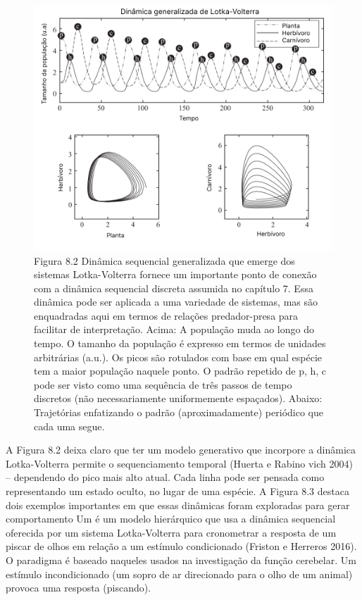 \documentclass[
  12pt,
]{book}
\begin{document}
\begin{figure}
\centering
\includegraphics{images/Figura_8_2.png}
\caption{Figura 8.2 Dinâmica sequencial generalizada que emerge dos sistemas Lotka-Volterra fornece um importante ponto de conexão com a dinâmica sequencial discreta assumida no capítulo 7. Essa dinâmica pode ser aplicada a uma variedade de sistemas, mas são enquadradas aqui em termos de relações predador-presa para facilitar de interpretação. Acima: A população muda ao longo do tempo. O tamanho da população é expresso em termos de unidades arbitrárias (a.u.). Os picos são rotulados com base em qual espécie tem a maior população naquele ponto. O padrão repetido de p, h, c pode ser visto como uma sequência de três passos de tempo discretos (não necessariamente uniformemente espaçados). Abaixo: Trajetórias enfatizando o padrão (aproximadamente) periódico que cada uma segue.}
\end{figure}

A Figura 8.2 deixa claro que ter um modelo generativo que incorpore a dinâmica Lotka-Volterra permite o sequenciamento temporal (Huerta e Rabino vich 2004) -- dependendo do pico mais alto atual. Cada linha pode ser pensada como representando um estado oculto, no lugar de uma espécie. A Figura 8.3 destaca dois exemplos importantes em que essas dinâmicas foram exploradas para gerar comportamento Um é um modelo hierárquico que usa a dinâmica sequencial oferecida por um sistema Lotka-Volterra para cronometrar a resposta de um piscar de olhos em relação a um estímulo condicionado (Friston e Herreros 2016). O paradigma é baseado naqueles usados na investigação da função cerebelar. Um estímulo incondicionado (um sopro de ar direcionado para o olho de um animal) provoca uma resposta (piscando).
\end{document}
